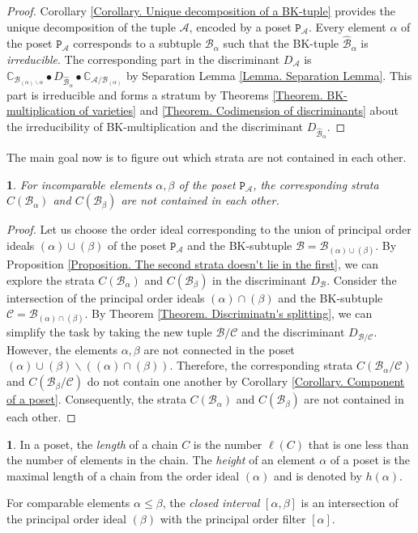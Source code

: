 \documentclass[11pt]{article}
\theoremstyle{plain}
\theoremstyle{definition}
\newtheorem{defn}[thm]{\protect\definitionname}
\theoremstyle{remark}
\theoremstyle{plain}
\newtheorem{lem}[thm]{\protect\lemmaname}
\theoremstyle{plain}
\theoremstyle{plain}
\theoremstyle{definition}
\providecommand{\definitionname}{Definition}
\providecommand{\lemmaname}{Lemma}
\begin{document}
\begin{proof}
Corollary \ref{Corollary. Unique decomposition of a BK-tuple} provides
the unique decomposition of the tuple $\mathscr{A}$, encoded by a
poset $\mathtt{P}_{\mathscr{A}}$. Every element $\alpha$ of the
poset $\mathtt{P}_{\mathscr{A}}$ corresponds to a subtuple $\mathscr{B}_{\alpha}$
such that the BK-tuple $\hat{\mathscr{B}}_{\alpha}$ is \textit{\emph{irreducible}}.
The corresponding part in the discriminant $D_{\mathscr{A}}$ is $\mathbb{C}_{\mathscr{B}_{(\alpha)\backslash\alpha}}\bullet D_{\hat{\mathscr{B}}_{\alpha}}\bullet\mathbb{C}_{\mathscr{A}/\mathscr{B}_{(\alpha)}}$
by Separation Lemma \ref{Lemma. Separation Lemma}. This part is irreducible
and forms a stratum by Theorems \ref{Theorem. BK-multiplication of varieties}
and \ref{Theorem. Codimension of discriminants} about the irreducibility
of BK-multiplication and the discriminant $D_{\hat{\mathscr{B}}_{\alpha}}$.
\end{proof}
The main goal now is to figure out which strata are not contained
in each other.
\begin{lem}
\label{Lemma. Incomparable elements}For incomparable elements $\alpha,\beta$
of the poset $\mathtt{P}_{\mathscr{A}}$, the corresponding strata
$C(\mathscr{B}_{\alpha})$ and $C(\mathscr{B}_{\beta})$ are not contained
in each other. 
\end{lem}

\begin{proof}
Let us choose the order ideal corresponding to the union of principal
order ideals $(\alpha)\cup(\beta)$ of the poset $\mathtt{P}_{\mathscr{A}}$
and the BK-subtuple $\mathscr{B}=\mathscr{B}_{(\alpha)\cup(\beta)}$.
By Proposition \ref{Proposition. The second strata doesn't lie in the first},
we can explore the strata $C(\mathscr{B}_{\alpha})$ and $C(\mathscr{B}_{\beta})$
in the discriminant $D_{\mathscr{B}}.$ Consider the intersection
of the principal order ideals $(\alpha)\cap(\beta)$ and the BK-subtuple
$\mathscr{C}=\mathscr{B}_{(\alpha)\cap(\beta)}$. By Theorem \ref{Theorem. Discriminatn's splitting},
we can simplify the task by taking the new tuple $\mathscr{B}/\mathscr{C}$
and the discriminant $D_{\mathscr{B}/\mathscr{C}}$. However, the
elements $\alpha,\beta$ are not connected in the poset $(\alpha)\cup(\beta)\backslash((\alpha)\cap(\beta))$.
Therefore, the corresponding strata $C(\mathscr{B}_{\alpha}/\mathscr{C})$
and $C(\mathscr{B}_{\beta}/\mathscr{C})$ do not contain one another
by Corollary \ref{Corollary. Component of a poset}. Consequently,
the strata $C(\mathscr{B}_{\alpha})$ and $C(\mathscr{B}_{\beta})$
are not contained in each other.
\end{proof}
\begin{defn}
In a poset, the \textit{length} of a chain $C$ is the number $\ell(C)$
that is one less than the number of elements in the chain. The \textit{height
}of an element $\alpha$ of a poset is the maximal length of a chain
from the order ideal $(\alpha)$ and is denoted by $h(\alpha)$.

For comparable elements $\alpha\leq\beta$, the \textit{closed interval}
$[\alpha,\beta]$ is an intersection of the principal order ideal
$(\beta)$ with the principal order filter $[\alpha]$.
\end{defn}
\end{document}
